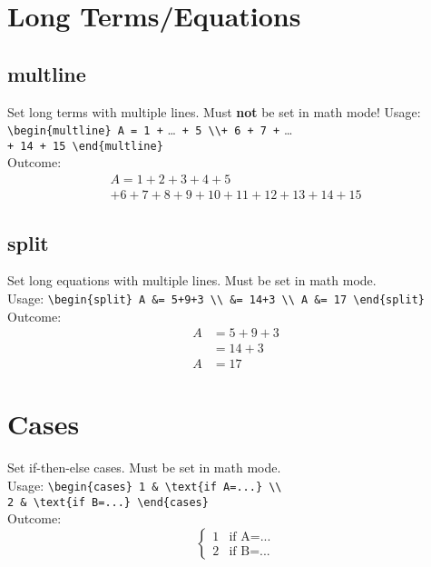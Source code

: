 \documentclass[draft]{../cheatsht/cheatsht}
\newcommand{\notx}{\textbf{not} }
\begin{document}
\section{Long Terms/Equations}
\subsection{multline}
Set long terms with multiple lines. Must \notx be set in math mode!
Usage: \verb!\begin{multline} A = 1 +! \ldots~\verb!+ 5 \\+ 6 + 7 +! \ldots \\
\verb!+ 14 + 15 \end{multline}!\\
Outcome:
\begin{multline} A = 1 + 2 + 3 + 4 + 5 \\
  + 6 + 7 + 8 + 9 + 10 + 11 + 12 + 13 + 14 + 15
\end{multline}

\subsection{split}
Set long equations with multiple lines. Must be set in math mode. \\
Usage: \verb!\begin{split} A &= 5+9+3 \\ &= 14+3 \\ A &= 17 \end{split}!
Outcome: \begin{displaymath}
  \begin{split} A &= 5+9+3 \\ &= 14+3 \\ A &= 17 \end{split}
\end{displaymath}

\section{Cases}
Set if-then-else cases. Must be set in math mode.\\
Usage: \verb!\begin{cases} 1 & \text{if A=...} \\!\\
\verb!2 & \text{if B=...} \end{cases}!\\
Outcome:\begin{displaymath}\begin{cases}
1&\text{if A=...}\\
2&\text{if B=...}
\end{cases}\end{displaymath}
\end{document}
